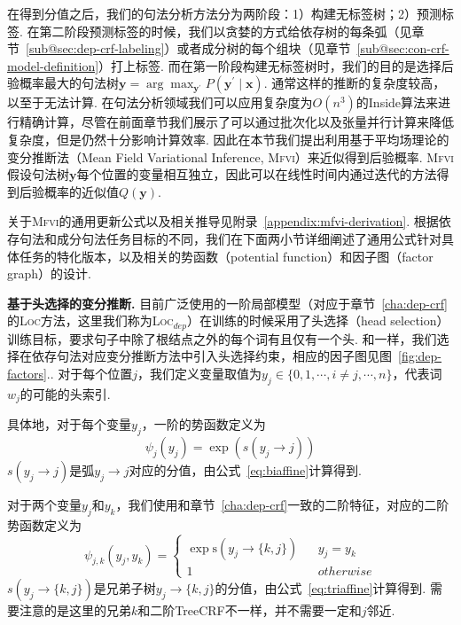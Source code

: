 在得到分值之后，我们的句法分析方法分为两阶段：1）构建无标签树；2）预测标签.
在第二阶段预测标签的时候，我们以贪婪的方式给依存树的每条弧（见章节~\ref{sub@sec:dep-crf-labeling}）或者成分树的每个组块（见章节~\ref{sub@sec:con-crf-model-definition}）打上标签.
而在第一阶段构建无标签树时，我们的目的是选择后验概率最大的句法树$\boldsymbol{y} = \arg\max_{\boldsymbol{y}^{\prime}} P(\boldsymbol{y}^{\prime}\mid \boldsymbol{x})$.
通常这样的推断的复杂度较高，以至于无法计算.
在句法分析领域我们可以应用复杂度为$O(n^3)$的Inside算法来进行精确计算，尽管在前面章节我们展示了可以通过批次化以及张量并行计算来降低复杂度，但是仍然十分影响计算效率.
因此在本节我们提出利用基于平均场理论的变分推断法（Mean Field Variational Inference, \textsc{Mfvi}）来近似得到后验概率.
\textsc{Mfvi}假设句法树$\boldsymbol{y}$每个位置的变量相互独立，因此可以在线性时间内通过迭代的方法得到后验概率的近似值$Q(\boldsymbol{y})$.

关于\textsc{Mfvi}的通用更新公式以及相关推导见附录~\ref{appendix:mfvi-derivation}.
根据依存句法和成分句法任务目标的不同，我们在下面两小节详细阐述了通用公式针对具体任务的特化版本，以及相关的势函数（potential function）和因子图（factor graph）的设计.

\noindent\textbf{基于头选择的变分推断.}
目前广泛使用的一阶局部模型（对应于章节~\ref{cha:dep-crf}的\textsc{Loc}方法，这里我们称为\textsc{Loc}$_{dep}$）在训练的时候采用了头选择（head selection）训练目标，要求句子中除了根结点之外的每个词有且仅有一个头.
和\citep{wang-tu-2020-second}一样，我们选择在依存句法对应变分推断方法中引入头选择约束，相应的因子图见图~\ref{fig:dep-factors}..
对于每个位置$j$，我们定义变量取值为$y_j\in \{0,1,\cdots,i\neq j,\cdots,n\}$，代表词$w_j$的可能的头索引.

具体地，对于每个变量$y_j$，一阶的势函数定义为
\begin{equation}
  \label{eq:dep-1o-potential}
  \psi_j(y_j)=\exp(s(y_j\rightarrow j))
\end{equation}
$s(y_j\rightarrow j)$是弧$y_j\rightarrow j$对应的分值，由公式~\ref{eq:biaffine}计算得到.

对于两个变量$y_{j}$和$y_{k}$，我们使用和章节~\ref{cha:dep-crf}一致的二阶特征，对应的二阶势函数定义为
\begin{equation}
  \label{eq:2o-dep-potential}
  \psi_{j,k}(y_j,y_k)=\left\{
  \begin{array}{rcl}
    \exp \mathrm{s}(y_j\rightarrow \{k,j\}) &  & {y_j=y_k}   \\
    1                                       &  & {otherwise}
  \end{array}
  \right.
\end{equation}
$s(y_j\rightarrow \{k,j\})$是兄弟子树$y_j\rightarrow \{k,j\}$的分值，由公式~\ref{eq:triaffine}计算得到.
需要注意的是这里的兄弟$k$和二阶TreeCRF不一样，并不需要一定和$j$邻近.

